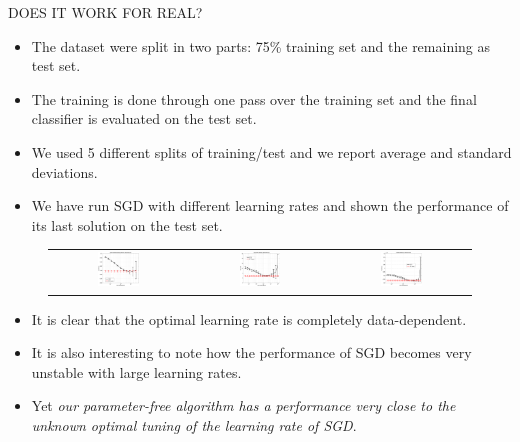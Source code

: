 \documentclass[final,t,serif,mathserif]{beamer}
\def\spazioo{\vspace{-0.3cm}}
\begin{document}
\begin{frame}{}
\begin{columns}[t]
\begin{column}{.33\linewidth}
    \begin{block}{DOES IT WORK FOR REAL?}
      \spazioo      
      \begin{itemize} 
        \item The dataset were split in two parts: 75\% training set and the remaining as test set.
        \item The training is done through one pass over the training set and the final classifier is evaluated on the test set.
        \item We used 5 different splits of training/test and we report average and standard deviations. 
        \item We have run SGD with different learning rates and shown the performance of its last solution on the test set.
       \end{itemize}
      \begin{figure}[t]
	\centering 
	\begin{tabular}{ccc}
	\includegraphics[width=0.32\textwidth]{../figs/yearPredictionMSD_kt_train_test-crop.pdf} &
        \includegraphics[width=0.32\textwidth]{../figs/cpusmall_kt_train_test-crop.pdf} &
        \includegraphics[width=0.32\textwidth]{../figs/cadata_kt_train_test-crop.pdf}
	\end{tabular}
      \end{figure}
      \begin{itemize} 
        \item It is clear that the optimal learning rate is completely data-dependent.
        \item It is also interesting to note how the performance of SGD becomes very unstable with large learning rates. \item Yet \emph{our parameter-free algorithm has a performance very close to the unknown optimal tuning of the learning rate of SGD}.
       \end{itemize}
      \spazioo
    \end{block}
    

\end{column}
\end{columns}
\end{frame}
\end{document}
